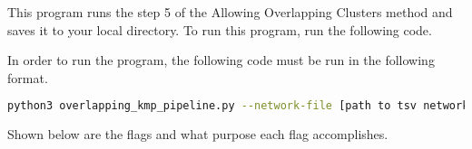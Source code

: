\documentclass[12pt, oneside]{article}   	%
\begin{document}
This program runs the step 5 of the Allowing Overlapping Clusters method and saves it to your local directory. To run this program, run the following code.

In order to run the  program, the following code must be run in the following format. 
 \lstset{
  breaklines=true,
}
\begin{lstlisting}[language=bash]
    python3 overlapping_kmp_pipeline.py --network-file [path to tsv network file] --clustering [path to input kmp-valid disjoint clustering csv file] -- output-path [path to save outputted overlapping clustering] --min-k-core [min k of input clustering] --rank-type [percent, percentile] --rank-val [top n percent of candidate nodes to consider adding, opposite if percentile] -- inclusion-criterion [k, mcd] --candidate-criterion [total_degree, indegree, random, seed] --candidate-file [file path to custom candidate list] --experiment-name [name of experiment being run] --experiment-num [experiment number being run] --config [bool, bool, bool, bool] (run overlapping?, display cluster stats?, include marker node analysis?, save outputs? 
\end{lstlisting}

Shown below are the flags and what purpose each flag accomplishes. 
\end{document}
